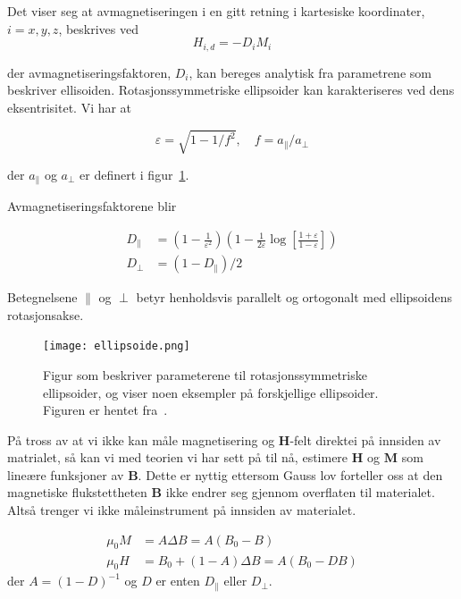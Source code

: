 \documentclass[a4paper,11pt, twocolumn]{article}
\begin{document}
Det viser seg at avmagnetiseringen i en gitt retning i kartesiske koordinater, $i = x,y,z$, beskrives ved 
\begin{equation}
	H_{i,d}=-D_iM_i
	\label{eq:Hi}
\end{equation}

der avmagnetiseringsfaktoren, $D_i$, kan bereges analytisk fra parametrene som beskriver ellisoiden.
Rotasjonssymmetriske ellipsoider kan karakteriseres ved dens eksentrisitet. Vi har at 

\begin{equation}
	\varepsilon = \sqrt{1-1/f^2}, \quad f = a_{\parallel}/a_{\perp}
	\label{eq:eksentrisitet}
\end{equation}

der $a_{\parallel}$ og $a_\perp$ er definert i figur~\ref{fig:ellipsoide}.

Avmagnetiseringsfaktorene blir 

\begin{align}
	D_\parallel &= \left( 1-\frac{1}{\varepsilon^2} \right)\left( 1-\frac{1}{2\varepsilon}\log\left[ \frac{1+\varepsilon}{1-\varepsilon} \right] \right)\\
	D_\perp &= (1-D_\parallel)/2
	\label{eq:avmagnetisering}
\end{align}

Betegnelsene $\parallel$ og $\perp$ betyr henholdsvis parallelt og ortogonalt med ellipsoidens rotasjonsakse.
\begin{figure}[!ht]
	\centering
	\texttt{[image: ellipsoide.png]}
	\caption{Figur som beskriver parameterene til rotasjonssymmetriske ellipsoider, og viser noen eksempler på forskjellige ellipsoider. Figuren er hentet fra~\cite{oppgavesett}.}
	\label{fig:ellipsoide}
\end{figure}

På tross av at vi ikke kan måle magnetisering og $\mathbf H$-felt direktei på innsiden av matrialet, så kan vi med teorien vi har sett på til nå, estimere $\mathbf H$ og $\mathbf M$ som lineære funksjoner av $\mathbf B$. Dette er nyttig ettersom Gauss lov forteller oss at den magnetiske flukstettheten $\mathbf B$ ikke endrer seg gjennom overflaten til materialet. Altså trenger vi ikke måleinstrument på innsiden av materialet. 

\begin{align}
	\mu_0 M &= A\Delta B = A(B_0-B)\\
	\mu_0 H &= B_0 + (1-A)\Delta B = A(B_0-DB) 
	\label{eq:1}
\end{align}
der $A = (1-D)^{-1}$ og $D$ er enten $D_\parallel$ eller $D_\perp$.
\end{document}
